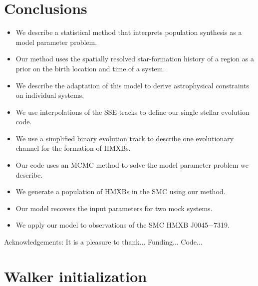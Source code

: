 \documentclass[12pt, preprint]{aastex}
\begin{document}
\section{Conclusions}

\begin{itemize}
\item We describe a statistical method that interprets population synthesis as a model parameter problem.\\
\item Our method uses the spatially resolved star-formation history of a region as a prior on the birth location and time of a system. \\
\item We describe the adaptation of this model to derive astrophysical constraints on individual systems. \\
\item We use interpolations of the SSE tracks to define our single stellar evolution code. \\
\item We use a simplified binary evolution track to describe one evolutionary channel for the formation of HMXBs. \\
\item Our code uses an MCMC method to solve the model parameter problem we describe. \\
\item We generate a population of HMXBs in the SMC using our method. \\
\item Our model recovers the input parameters for two mock systems. \\
\item We apply our model to observations of the SMC HMXB J0045$-$7319.
\end{itemize}


\acknowledgements
Acknowledgements:
It is a pleasure to thank...
Funding...
Code...



\appendix

\section{Walker initialization} \label{sec:initialize}
\end{document}
